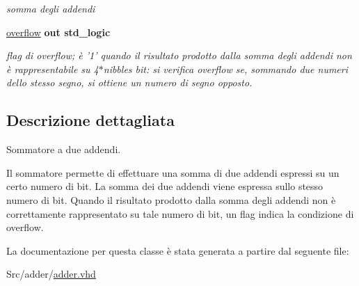 \begin{DoxyCompactItemize}
\begin{DoxyCompactList}\small\item\em somma degli addendi \end{DoxyCompactList}\item 
\hyperlink{group___adder_ga9650307dde287e0bcfa1e26370c006c2}{overflow}  {\bfseries {\bfseries \textcolor{vhdlchar}{out}\textcolor{vhdlchar}{ }}} {\bfseries \textcolor{vhdlchar}{std\+\_\+logic}\textcolor{vhdlchar}{ }} 
\begin{DoxyCompactList}\small\item\em flag di overflow; è '1' quando il risultato prodotto dalla somma degli addendi non è rappresentabile su 4$\ast$nibbles bit\+: si verifica overflow se, sommando due numeri dello stesso segno, si ottiene un numero di segno opposto. \end{DoxyCompactList}\end{DoxyCompactItemize}


\subsection{Descrizione dettagliata}
Sommatore a due addendi. 

Il sommatore permette di effettuare una somma di due addendi espressi su un certo numero di bit. La somma dei due addendi viene espressa sullo stesso numero di bit. Quando il risultato prodotto dalla somma degli addendi non è correttamente rappresentato su tale numero di bit, un flag indica la condizione di overflow. 

La documentazione per questa classe è stata generata a partire dal seguente file\+:\begin{DoxyCompactItemize}
\item 
Src/adder/\hyperlink{adder_8vhd}{adder.\+vhd}\end{DoxyCompactItemize}

